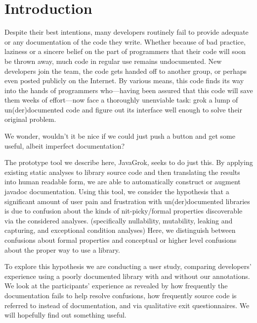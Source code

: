\section{Introduction}

Despite their best intentions, many developers routinely fail to provide
adequate or any documentation of the code they write.  Whether because of bad
practice, laziness or a sincere belief on the part of programmers that their
code will soon be thrown away, much code in regular use remains undocumented.
New developers join the team, the code gets handed off to another group, or
perhaps even posted publicly on the Internet.  By various means, this code
finds its way into the hands of programmers who---having been assured that this
code will save them weeks of effort---now face a thoroughly unenviable task:
grok a lump of un(der)documented code and figure out its interface well enough
to solve their original problem.


We wonder, wouldn't it be nice if we could just push a button and get some useful, albeit imperfect documentation?

The prototype tool we describe here, JavaGrok, seeks to do just this.  By
applying existing static analyses to library source code and then
translating the results into human readable form, we are able to
automatically construct or augment javadoc documentation.
Using this tool, we
consider the hypothesis that a significant amount of user pain and frustration
with un(der)documented libraries is due to confusion about the kinds of
nit-picky/formal properties discoverable via the
considered analyses. (specifically nullability, mutability,
leaking and capturing, and exceptional condition analyses)
Here, we distinguish between confusions about formal properties
and conceptual
or higher level confusions about the proper way to use a library.

To explore this hypothesis we are conducting a user study, comparing developers'
experience using a poorly documented library with and without our
annotations.  We look at the participants' experience as revealed
by how frequently the
documentation fails to help resolve confusions, how frequently source
code is referred to instead of documentation, and via qualitative exit
questionnaires.  We will hopefully find out something useful.

